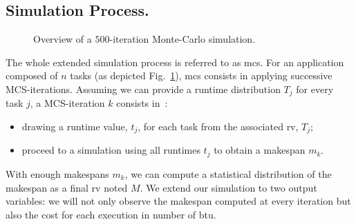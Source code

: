 \documentclass[]{llncs}
\begin{document}
\subsection{Simulation Process.}
\begin{figure}[bt]
	\centering

	\resizebox{0.9\textwidth}{!}{%
		
		}
\caption{Overview of a $500$-iteration Monte-Carlo simulation.}\label{fig:mc-process}
\end{figure}
The whole extended simulation process is referred to as \ac{mcs}. 
For an application composed of $n$ tasks (as depicted Fig.~\ref{fig:mc-process}),
\ac{mcs} consists in applying successive MCS-iterations. Assuming we can provide a
runtime distribution $T_j$ for every task $j$, a MCS-iteration $k$ consists in~:
\begin{itemize}
\item drawing a runtime value, $t_j$, for each task from the associated
	\acs{rv}, $T_j$;
\item proceed to a simulation using all runtimes $t_j$ to obtain a makespan $m_k$.
\end{itemize}
With enough  makespans $m_k$, we can  compute a statistical distribution  of the
makespan as a  final \ac{rv} noted $M$.  We extend our simulation  to two output
variables: we will not only observe the makespan computed at every iteration but
also the cost for each execution in number of \ac{btu}.
\end{document}
